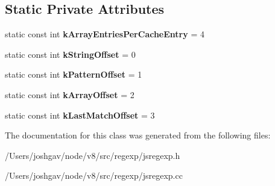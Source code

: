 \subsection*{Static Private Attributes}
\begin{DoxyCompactItemize}
\item 
static const int {\bfseries k\+Array\+Entries\+Per\+Cache\+Entry} = 4\hypertarget{classv8_1_1internal_1_1_reg_exp_results_cache_a1d49f258d80b25dfac470778a75086fb}{}\label{classv8_1_1internal_1_1_reg_exp_results_cache_a1d49f258d80b25dfac470778a75086fb}

\item 
static const int {\bfseries k\+String\+Offset} = 0\hypertarget{classv8_1_1internal_1_1_reg_exp_results_cache_a05651f61bc940246862e6b685c060ccf}{}\label{classv8_1_1internal_1_1_reg_exp_results_cache_a05651f61bc940246862e6b685c060ccf}

\item 
static const int {\bfseries k\+Pattern\+Offset} = 1\hypertarget{classv8_1_1internal_1_1_reg_exp_results_cache_a0d4fc12553fec564bec43f9b17fc4689}{}\label{classv8_1_1internal_1_1_reg_exp_results_cache_a0d4fc12553fec564bec43f9b17fc4689}

\item 
static const int {\bfseries k\+Array\+Offset} = 2\hypertarget{classv8_1_1internal_1_1_reg_exp_results_cache_ae0ccd05a62fe7076d644210a6cd75079}{}\label{classv8_1_1internal_1_1_reg_exp_results_cache_ae0ccd05a62fe7076d644210a6cd75079}

\item 
static const int {\bfseries k\+Last\+Match\+Offset} = 3\hypertarget{classv8_1_1internal_1_1_reg_exp_results_cache_ad5b3b87521f851fc55090601ffa752dc}{}\label{classv8_1_1internal_1_1_reg_exp_results_cache_ad5b3b87521f851fc55090601ffa752dc}

\end{DoxyCompactItemize}


The documentation for this class was generated from the following files\+:\begin{DoxyCompactItemize}
\item 
/\+Users/joshgav/node/v8/src/regexp/jsregexp.\+h\item 
/\+Users/joshgav/node/v8/src/regexp/jsregexp.\+cc\end{DoxyCompactItemize}
